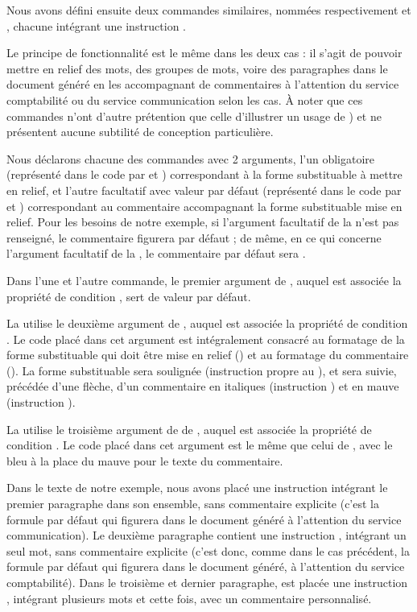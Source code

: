 \documentclass{article}
\begin{document}
\tutostep
Nous avons défini ensuite deux commandes similaires, nommées respectivement  et , chacune intégrant une instruction .

Le principe de fonctionnalité est le même dans les deux cas : il s'agit de pouvoir mettre en relief des mots, des groupes de mots, voire des paragraphes dans le document généré en les accompagnant de commentaires à l'attention du service comptabilité ou du service communication selon les cas. À noter que ces commandes n'ont d'autre prétention que celle d'illustrer un usage de ) et ne présentent aucune subtilité de conception particulière.

Nous déclarons chacune des commandes avec 2 arguments, l'un obligatoire (représenté dans le code par  et ) correspondant à la forme substituable à mettre en relief, et l'autre facultatif avec valeur par défaut (représenté dans le code par  et ) correspondant au commentaire accompagnant la forme substituable mise en relief. Pour les besoins de notre exemple, si l'argument facultatif de la  n'est pas renseigné, le commentaire  figurera par défaut ; de même, en ce qui concerne l'argument facultatif de la , le commentaire par défaut sera .

Dans l'une et l'autre commande, le premier argument de , auquel est associée la propriété de condition , sert de valeur par défaut.

La  utilise le deuxième argument de , auquel est associée la propriété de condition . Le code placé dans cet argument est intégralement consacré au formatage de la forme substituable qui doit être mise en relief () et au formatage du commentaire (). La forme substituable sera soulignée (instruction  propre au ), et sera suivie, précédée d'une flèche, d'un commentaire en italiques (instruction ) et en mauve (instruction ).

La  utilise le troisième argument de de , auquel est associée la propriété de condition . Le code placé dans cet argument est le même que celui de , avec le bleu à la place du mauve pour le texte du commentaire.

Dans le texte de notre exemple, nous avons placé une instruction  intégrant le premier paragraphe dans son ensemble, sans commentaire explicite (c'est la formule par défaut qui figurera dans le document généré à l'attention du service communication). Le deuxième paragraphe contient une instruction , intégrant un seul mot, sans commentaire explicite (c'est donc, comme dans le cas précédent, la formule par défaut qui figurera dans le document généré, à l'attention du service comptabilité). Dans le troisième et dernier paragraphe, est placée une instruction , intégrant plusieurs mots et cette fois, avec un commentaire personnalisé.
\end{document}
